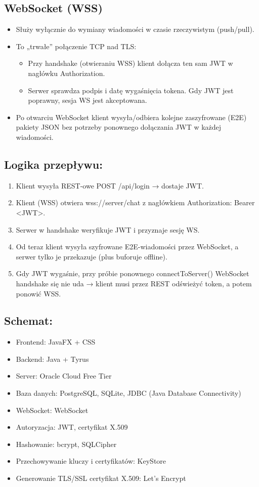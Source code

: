 \documentclass[a4paper,12pt]{article}
\begin{document}
\subsection*{WebSocket (WSS)}
\begin{itemize}
    \item Służy wyłącznie do wymiany wiadomości w czasie rzeczywistym (push/pull).
    \item To „trwałe” połączenie TCP nad TLS:
    \begin{itemize}
        \item Przy handshake (otwieraniu WSS) klient dołącza ten sam JWT w nagłówku Authorization.
        \item Serwer sprawdza podpis i datę wygaśnięcia tokena. Gdy JWT jest poprawny, sesja WS jest akceptowana.
    \end{itemize}
    \item Po otwarciu WebSocket klient wysyła/odbiera kolejne zaszyfrowane (E2E) pakiety JSON bez potrzeby ponownego dołączania JWT w każdej wiadomości.
\end{itemize}

\subsection*{Logika przepływu:}
\begin{enumerate}
    \item Klient wysyła REST-owe POST /api/login → dostaje JWT.
    \item Klient (WSS) otwiera wss://server/chat z nagłówkiem Authorization: Bearer <JWT>.
    \item Serwer w handshake weryfikuje JWT i przyznaje sesję WS.
    \item Od teraz klient wysyła szyfrowane E2E-wiadomości przez WebSocket, a serwer tylko je przekazuje (plus buforuje offline).
    \item Gdy JWT wygaśnie, przy próbie ponownego connectToServer() WebSocket handshake się nie uda → klient musi przez REST odświeżyć token, a potem ponowić WSS.
\end{enumerate}

\subsection*{Schemat:}
\begin{itemize}
    \item Frontend: JavaFX + CSS
    \item Backend: Java + Tyrus
    \item Server: Oracle Cloud Free Tier
    \item Baza danych: PostgreSQL, SQLite, JDBC (Java Database Connectivity)
    \item WebSocket: WebSocket
    \item Autoryzacja: JWT, certyfikat X.509
    \item Hashowanie: bcrypt, SQLCipher
    \item Przechowywanie kluczy i certyfikatów: KeyStore
    \item Generowanie TLS/SSL certyfikat X.509: Let’s Encrypt
\end{itemize}
\end{document}
